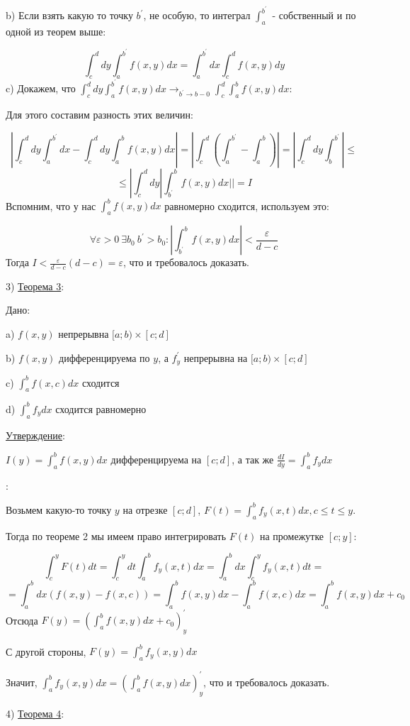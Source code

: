 \documentclass[12pt]{article}
\begin{document}
b) Если взять какую то точку $b^{'}$, не особую, то интеграл $\int_a^{b^{'}}$ - собственный и по одной из теорем выше:\par
$$\int_c^d dy \int_a^{b^{'}} f(x,y) dx = \int_{a}^{b^{'}} dx \int_c^d f(x,y) dy$$
c) Докажем, что $\int_c^d dy \int_a^{b^{'}} f(x,y) dx \to_{b^{'}\to b-0} \int_c^d \int_a^b f(x,y) dx$:\par
Для этого составим разность этих величин:\par
$$|\int_c^d dy \int_a^{b^{'}} dx - \int_c^d dy \int_a^b f(x,y) dx| = |\int_c^d (\int_a^{b^{'}} - \int_a^b)| = |\int_c^d dy \int_b^{b^{'}} | \leq$$
$$ \leq |\int_c^d dy |\int_{b^{'}}^b f(x,y) dx|| = I$$
Вспомним, что у нас $\int_a^b f(x,y) dx$ равномерно сходится, используем это:\par
$$\forall \varepsilon > 0 \ \exists b_0 \ b^{'} > b_0 : | \int_{b^{'}}^b f(x,y) dx| < \frac{\varepsilon}{d-c}$$
Тогда $I < \frac{\varepsilon}{d-c} (d-c) = \varepsilon$, что и требовалось доказать.\par
3) \uline{Теорема 3}:\par
Дано:\par
a) $f(x,y)$ непрерывна $[a; b) \times [c;d]$\par
b) $f(x,y)$ дифференцируема по $y$, а $f^{'}_y$ непрерывна на $[a; b) \times [c;d]$\par
c) $\int_a^b f(x,c) dx$ сходится\par
d) $\int_a^b f_y dx$ сходится равномерно\par
\uline{Утверждение}:\par
$I(y) = \int_a^b f(x,y) dx$ дифференцируема на $[c;d]$, а так же $\frac{d I}{dy} = \int_a^b f_y dx$\par
{}:\par
Возьмем какую-то точку $y$ на отрезке $[c;d]$, $F(t) = \int_a^b f_y(x,t) dx, c \leq t \leq y$.\par
Тогда по теореме 2 мы имеем право интегрировать $F(t)$ на промежутке $[c;y]$:\par
$$\int_c^y F(t) dt = \int_c^y dt \int_a^b f_y(x,t) dx = \int_a^b dx \int_c^y f_y(x,t) dt =$$
$$= \int_a^b dx(f(x,y) - f(x,c)) = \int_a^b f(x,y) dx - \int_a^b f(x,c) dx = \int_a^b f(x,y) dx + c_0$$
Отсюда $F(y) = (\int_a^b f(x,y) dx + c_0)_y^{'}$\par
С другой стороны, $F(y) = \int_a^b f_y (x,y) dx$\par
Значит, $\int_a^b f_y(x,y) dx = (\int_a^b f(x,y)dx)^{'}_y$, что и требовалось доказать.\par
4) \uline{Теорема 4}:\par
\end{document}
